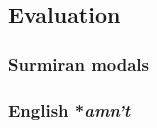 \subsection{Evaluation}

\subsubsection{Surmiran modals}

\citet{Anderson2010b}

\subsubsection{English *\emph{amn't}}

\citet{Bresnan2001}
\citet{Embick2010}
